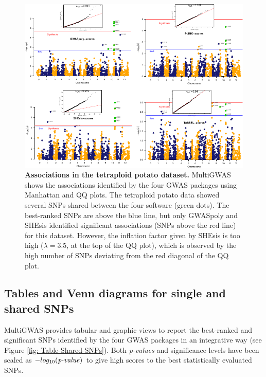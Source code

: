 \documentclass{article}
\begin{document}
\begin{figure}[H]
\begin{centering}
\includegraphics{images/paper-manhattan-QQ-plots}
\par\end{centering}
\caption{\textbf{{Associations in the tetraploid potato dataset.}} MultiGWAS shows the associations identified by the four GWAS packages using Manhattan and QQ plots. The tetraploid potato data showed several SNPs shared between the four software (green dots). The best-ranked SNPs are above the blue line, but only GWASpoly and SHEsis identified significant associations (SNPs above the red line) for this dataset. However, the inflation factor given by SHEsis is too high ($\lambda=3.5$, at the top of the QQ plot), which is observed by the high number of SNPs deviating from the red diagonal of the QQ plot. \label{fig:view-qqmanhattan}}
\end{figure}


\subsection{Tables and Venn diagrams for single and shared SNPs}

MultiGWAS provides tabular and graphic views to report the best-ranked and significant SNPs identified by the four GWAS packages in an integrative way (see Figure \ref{fig: Table-Shared-SNPs}). Both \emph{p-values} and significance levels have been scaled as $-log_{10}({\operatorname{\mathit{p-value}}})$ to give high scores to the best statistically evaluated SNPs.
\end{document}
